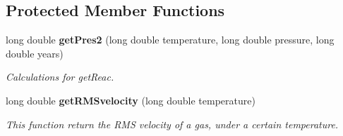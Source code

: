 \subsection*{Protected Member Functions}
\begin{CompactItemize}
\item 
long double {\bf get\-Pres2} (long double temperature, long double pressure, long double years)
\begin{CompactList}\small\item\em Calculations for get\-Reac. \item\end{CompactList}\item 
long double {\bf get\-RMSvelocity} (long double temperature)
\begin{CompactList}\small\item\em This function return the RMS velocity of a gas, under a certain temperature. \item\end{CompactList}\end{CompactItemize}
